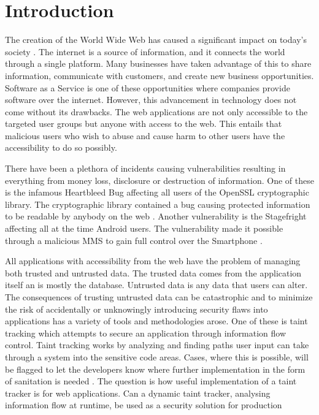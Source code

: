 \chapter{Introduction}
\label{Introduction}

The creation of the World Wide Web has caused a significant impact on today's society \parencite{www}. The internet is a source of information, and it connects the world through a single platform. Many businesses have taken advantage of this to share information, communicate with customers, and create new business opportunities. Software as a Service is one of these opportunities where companies provide software over the internet. \parencite{AllenB.2012SAaS, xaas, NewcombeLee2012SaSa} However, this advancement in technology does not come without its drawbacks. The web applications are not only accessible to the targeted user groups but anyone with access to the web. This entails that malicious users who wish to abuse and cause harm to other users have the accessibility to do so possibly. 

There have been a plethora of incidents causing vulnerabilities resulting in everything from money loss, disclosure or destruction of information. One of these is the infamous Heartbleed Bug affecting all users of the OpenSSL cryptographic library. The cryptographic library contained a bug causing protected information to be readable by anybody on the web \parencite{Heartbleed}. Another vulnerability is the Stagefright affecting all at the time Android users. The vulnerability made it possible through a malicious MMS to gain full control over the Smartphone \parencite{2015ASvt}. 

All applications with accessibility from the web have the problem of managing both trusted and untrusted data. The trusted data comes from the application itself an is mostly the database. Untrusted data is any data that users can alter. The consequences of trusting untrusted data can be catastrophic and to minimize the risk of accidentally or unknowingly introducing security flaws into applications has a variety of tools and methodologies arose. One of these is taint tracking which attempts to secure an application through information flow control. Taint tracking works by analyzing and finding paths user input can take through a system into the sensitive code areas. Cases, where this is possible, will be flagged to let the developers know where further implementation in the form of sanitation is needed \parencite{Pan2015, Venkataramani2008}. The question is how useful implementation of a taint tracker is for web applications. Can a dynamic taint tracker, analysing information flow at runtime, be used as a security solution for production services?

